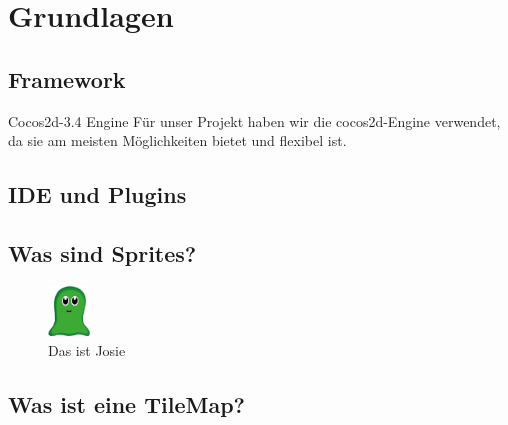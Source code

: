 \chapter{Grundlagen}

\section{Framework}

Cocos2d-3.4 Engine
Für unser Projekt haben wir die cocos2d-Engine verwendet, da sie am meisten Möglichkeiten bietet und flexibel ist.

\section{IDE und Plugins}

\section{Was sind Sprites?}
\begin{figure}
  \includegraphics[width=0.1\textwidth]{resources/josie}
  \caption{Das ist Josie}
  \label{fig:josie} 
\end{figure}
\section{Was ist eine TileMap?}


